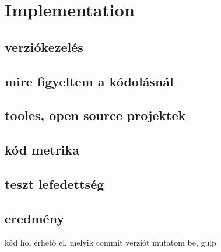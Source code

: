 \chapter{Implementation}

\section{verziókezelés}
\section{mire figyeltem a kódolásnál}
\section{tooles, open source projektek}
\section{kód metrika}
\section{teszt lefedettség}
\section{eredmény}
kód hol érhető el, melyik commit verziót mutatom be, gulp